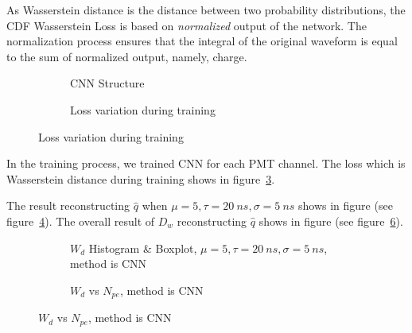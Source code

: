 As Wasserstein distance is the distance between two probability distributions, the CDF Wasserstein Loss is based on \emph{normalized} output of the network. The normalization process ensures that the integral of the original waveform is equal to the sum of normalized output, namely, charge. 

\begin{figure}[H]
\begin{minipage}[b]{.4\textwidth}
\begin{figure}[H]
    \begin{center}
    \begin{adjustbox}{width=0.6\textwidth}
        
    \end{adjustbox}
    \end{center}
    \caption{\label{fig:struct} CNN Structure}
\end{figure}
\end{minipage}
\begin{minipage}[b]{.6\textwidth}
\begin{figure}[H]
    \centering
    \resizebox{\textwidth}{!}{}
    \caption{\label{fig:loss} Loss variation during training}
\end{figure}
\end{minipage}
\end{figure}

In the training process, we trained CNN for each PMT channel. The loss which is Wasserstein distance during training shows in figure~\ref{fig:loss}. 

The result reconstructing $\hat{q}$ when $\mu=5, \tau=\SI{20}{ns}, \sigma=\SI{5}{ns}$ shows in figure (see figure~\ref{fig:cnn-hist}). The overall result of $D_w$ reconstructing $\hat{q}$ shows in figure (see figure~\ref{fig:cnn-npe}). 

\begin{figure}[H]
\begin{minipage}[t]{.5\textwidth}
\begin{figure}[H]
    \centering
    \resizebox{\textwidth}{!}{}
    \caption{\label{fig:cnn-hist} $W_{d}$ Histogram \& Boxplot, $\mu=5, \tau=\SI{20}{ns}, \sigma=\SI{5}{ns}$, method is CNN}
\end{figure}
\end{minipage}
\begin{minipage}[t]{.5\textwidth}
\begin{figure}[H]
    \centering
    \resizebox{\textwidth}{!}{}
    \caption{\label{fig:cnn-npe} $W_{d}$ vs $N_{pe}$, method is CNN}
\end{figure}
\end{minipage}
\end{figure}

